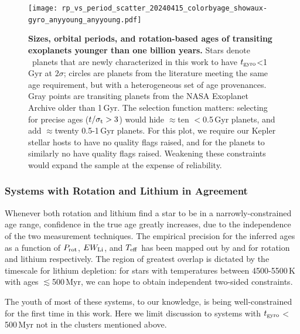 \documentclass[11pt,twocolumn,tighten]{aastex63}
\begin{document}
\begin{figure}[!t]
	\begin{center}
		\texttt{[image: rp\_vs\_period\_scatter\_20240415\_colorbyage\_showaux-gyro\_anyyoung\_anyyoung.pdf]}
	\end{center}
	\vspace{-0.5cm}
	
	\caption{
    {\bf Sizes, orbital periods, and rotation-based ages of transiting
    exoplanets younger than one billion years.} Stars denote
    \nplyounggyrotwosigmanograzingnoruwe\ planets that are newly
    characterized in this work to have $t_{\rm gyro}$<1\,Gyr at
    $2$$\sigma$; circles are planets from the literature meeting the
    same age requirement, but with a heterogeneous set of age
    provenances.  Gray points are transiting planets from the NASA
    Exoplanet Archive older than 1\,Gyr.  The selection function
    matters: selecting for precise ages ($t/\sigma_{\rm t}>3$) would
    hide $\approx$ten $<$0.5\,Gyr planets, and add $\approx$twenty
    0.5-1\,Gyr planets.  For this plot, we require our Kepler stellar
    hosts to have no quality flags raised, and for the planets to
    similarly no have quality flags raised.  Weakening these
    constraints would expand the sample at the expense of reliability.
		\label{fig:rp_period_age_results}
	}
\end{figure}

\subsubsection{Systems with Rotation and Lithium in Agreement}
%
Whenever both rotation and lithium find a star to be in a
narrowly-constrained age range, confidence in the true age greatly
increases, due to the independence of the two measurement techniques.
The empirical precision for the inferred ages as a function of $P_{\rm
rot}$, $EW_{\rm Li}$, and $T_{\rm eff}$ has been mapped out by
\citet{Bouma_2023} and \citet{Jeffries_2023} for rotation and lithium
respectively.  The region of greatest overlap is dictated by the
timescale for lithium depletion: for stars with temperatures between
4500-5500\,K with ages $\lesssim$500\,Myr, we can hope to obtain
independent two-sided constraints.

The youth of most of these systems, to our knowledge, is being
well-constrained for the first time in this work.  Here we limit
discussion to systems with $t_{\rm gyro}$$<$500\,Myr not in the clusters
mentioned above.
\end{document}
